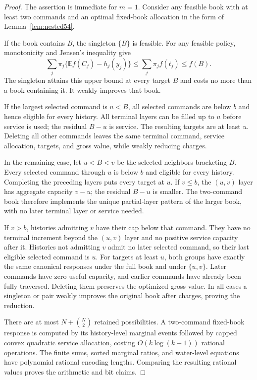 \begin{proof}
The assertion is immediate for $m=1$. Consider any feasible book with at least two commands and an optimal fixed-book allocation in the form of Lemma~\ref{lem:nested54}.

If the book contains $B$, the singleton $\{B\}$ is feasible. For any feasible policy, monotonicity and Jensen's inequality give
\[
 \sum_j\pi_j\{\mathbb E f(C_j)-h_j(y_j)\}
 \leq\sum_j\pi_jf(t_j)\leq f(B).
\]
The singleton attains this upper bound at every target $B$ and costs no more than a book containing it. It weakly improves that book.

If the largest selected command is $u<B$, all selected commands are below $b$ and hence eligible for every history. All terminal layers can be filled up to $u$ before service is used; the residual $B-u$ is service. The resulting targets are at least $u$. Deleting all other commands leaves the same terminal command, service allocation, targets, and gross value, while weakly reducing charges.

In the remaining case, let $u<B<v$ be the selected neighbors bracketing $B$. Every selected command through $u$ is below $b$ and eligible for every history. Completing the preceding layers puts every target at $u$. If $v\leq b$, the $(u,v)$ layer has aggregate capacity $v-u$; the residual $B-u$ is smaller. The two-command book therefore implements the unique partial-layer pattern of the larger book, with no later terminal layer or service needed.

If $v>b$, histories admitting $v$ have their cap below that command. They have no terminal increment beyond the $(u,v)$ layer and no positive service capacity after it. Histories not admitting $v$ admit no later selected command, so their last eligible selected command is $u$. For targets at least $u$, both groups have exactly the same canonical responses under the full book and under $\{u,v\}$. Later commands have zero useful capacity, and earlier commands have already been fully traversed. Deleting them preserves the optimized gross value. In all cases a singleton or pair weakly improves the original book after charges, proving the reduction.

There are at most $N+\binom N2$ retained possibilities. A two-command fixed-book response is computed by its history-level marginal events followed by capped convex quadratic service allocation, costing $O(k\log(k+1))$ rational operations. The finite sums, sorted marginal ratios, and water-level equations have polynomial rational encoding lengths. Comparing the resulting rational values proves the arithmetic and bit claims.
\end{proof}

